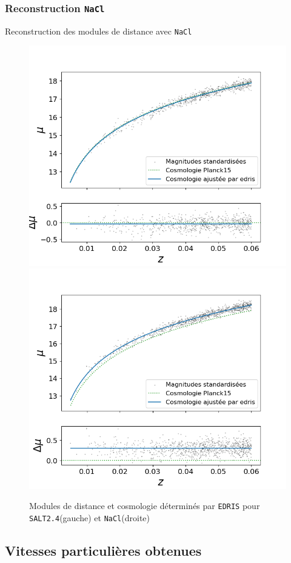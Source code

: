 \documentclass{beamer}
\def\nacl{\texttt{NaCl}\xspace}
\def\edris{\texttt{EDRIS}\xspace}
\def\saltd{\texttt{SALT2.4}\xspace}
\begin{document}
\subsubsection{Reconstruction \nacl}
\begin{frame}{Reconstruction des modules de distance avec \nacl}
\begin{figure}
	\centering
	\includegraphics[width=.48\textwidth]{figures/salt_cosmo.png}
	\includegraphics[width=.48\textwidth]{figures/nacl_cosmo.png}
	\caption{Modules de distance et cosmologie déterminés par \edris pour \saltd (gauche) et \nacl (droite)}
\end{figure}
\end{frame}

\subsection{Vitesses particulières obtenues}
\end{document}
